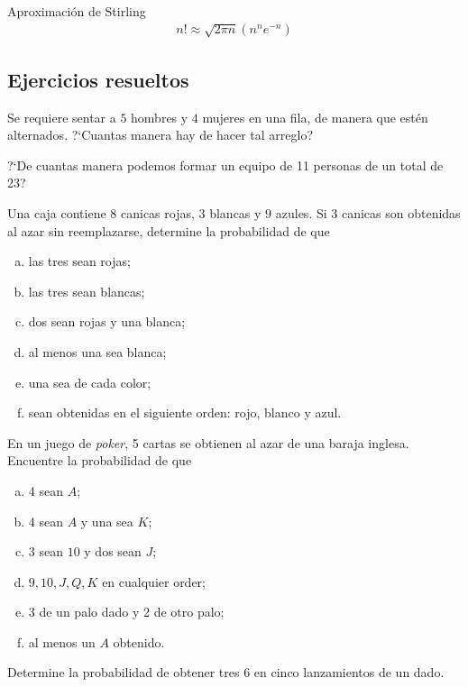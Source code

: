 {Aproximación de Stirling}
\begin{align}
 \label{eq:0.1.33}
 n! \approx \sqrt{2\pi n}\left( n^{n}e^{-n} \right)
\end{align}


 \subsection{Ejercicios resueltos}
 {}
  \begin{ejemplo}
   \label{exmp:0.1.s22}
 	Se requiere sentar a $5$ hombres y $4$ mujeres en una fila, de manera que estén alternados. ?`Cuantas manera hay de hacer tal arreglo?
  \end{ejemplo}
 
 {}
  \begin{ejemplo}
   \label{exmp:0.1.s29}
 	?`De cuantas manera podemos formar un equipo de 11 personas de un total de 23?
  \end{ejemplo}
 
 {}
  \begin{ejemplo}
   \label{exmp:0.1.s35}
 	Una caja contiene $8$ canicas rojas, $3$ blancas y $9$ azules. Si 3 canicas son obtenidas al azar sin reemplazarse, determine la probabilidad de que
 	\begin{enumerate}[(a)]
 	 \item las tres sean rojas; 
 	 \item las tres sean blancas; 
 	 \item dos sean rojas y una blanca; 
 	 \item al menos una sea blanca; 
 	 \item una sea de cada color; 
 	 \item sean obtenidas en el siguiente orden: rojo, blanco y azul.
 	\end{enumerate}

  \end{ejemplo}
 
 {}
  \begin{ejemplo}
   \label{exmp:0.1.s36}
 	En un juego de \emph{poker}, 5 cartas se obtienen al azar de una baraja inglesa. Encuentre la probabilidad de que
 	\begin{enumerate}[(a)]
 	 \item 4 sean $A$; 
 	 \item 4 sean $A$ y una sea $K$; 
 	 \item 3 sean $10$ y dos sean $J$; 
 	 \item $9,10,J,Q,K$ en cualquier order; 
 	 \item 3 de un palo dado y 2 de otro palo; 
 	 \item al menos un $A$ obtenido.
 	\end{enumerate}

  \end{ejemplo}
 
 {}
  \begin{ejemplo}
   \label{exmp:0.1.s37}
 		Determine la probabilidad de obtener tres $6$ en cinco lanzamientos de un dado.
  \end{ejemplo}
 
%
